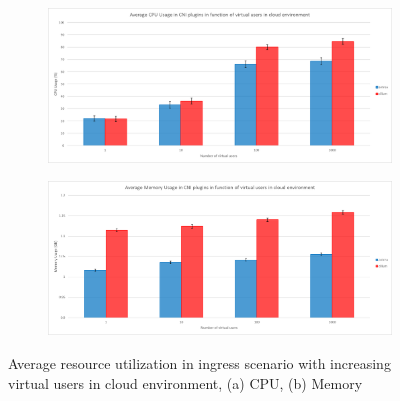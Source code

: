 \begin{figure}[H]
    \centering
    \begin{subfigure}[b]{0.8\textwidth}
        \includegraphics[width=\textwidth]{plots/traffic-splitting/cpu_cloud.png}
        \caption{}
        \label{fig:cpu_cloud_avg}
    \end{subfigure}
    \begin{subfigure}[b]{0.8\textwidth}
        \includegraphics[width=\textwidth]{plots/traffic-splitting/memory_cloud.png}
        \caption{}
        \label{fig:memory_cloud_avg}
    \end{subfigure}
    
    \caption{Average resource utilization in ingress scenario with increasing virtual users in cloud environment, (a) CPU, (b) Memory}
    \label{fig:resource_cloud_avg}
\end{figure}

